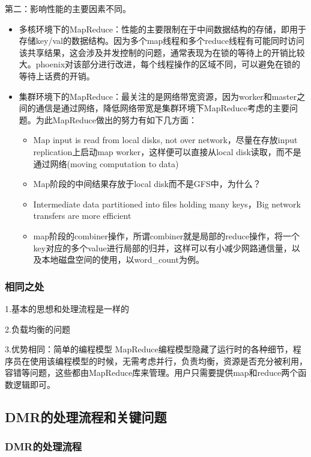 第二：影响性能的主要因素不同。
\begin{itemize}
  \item 多核环境下的MapReduce：性能的主要限制在于中间数据结构的存储，即用于存储key/val的数据结构。因为多个map线程和多个reduce线程有可能同时访问该共享结果，这会涉及并发控制的问题，通常表现为在锁的等待上的开销比较大。phoenix对该部分进行改进，每个线程操作的区域不同，可以避免在锁的等待上话费的开销。
  \item 集群环境下的MapReduce：最关注的是网络带宽资源，因为worker和master之间的通信是通过网络，降低网络带宽是集群环境下MapReduce考虑的主要问题。为此MapReduce做出的努力有如下几方面：
  
\begin{itemize}
  \item Map input is read from local disks, not over network，尽量在存放input replication上启动map worker，这样便可以直接从local disk读取，而不是通过网络(moving computation to data)
  \item Map阶段的中间结果存放于local disk而不是GFS中，为什么？
  \item Intermediate data partitioned into files holding many keys，Big network transfers are more efficient
  \item map阶段的combiner操作，所谓combiner就是局部的reduce操作，将一个key对应的多个value进行局部的归并，这样可以有小减少网路通信量，以及本地磁盘空间的使用，以word\_count为例。
\end{itemize}
  
\end{itemize}


\subsubsection{相同之处}
1.基本的思想和处理流程是一样的


2.负载均衡的问题

3.优势相同：简单的编程模型
MapReduce编程模型隐藏了运行时的各种细节，程序员在使用该编程模型的时候，无需考虑并行，负责均衡，资源是否充分被利用，容错等问题，这些都由MapReduce库来管理。用户只需要提供map和reduce两个函数逻辑即可。

\subsection{DMR的处理流程和关键问题}

\subsubsection{DMR的处理流程}

